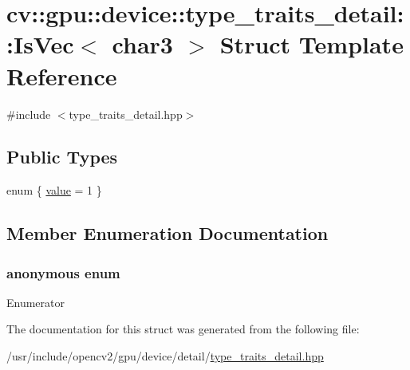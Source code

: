 \hypertarget{structcv_1_1gpu_1_1device_1_1type__traits__detail_1_1IsVec_3_01char3_01_4}{\section{cv\-:\-:gpu\-:\-:device\-:\-:type\-\_\-traits\-\_\-detail\-:\-:Is\-Vec$<$ char3 $>$ Struct Template Reference}
\label{structcv_1_1gpu_1_1device_1_1type__traits__detail_1_1IsVec_3_01char3_01_4}
}


{\ttfamily \#include $<$type\-\_\-traits\-\_\-detail.\-hpp$>$}

\subsection*{Public Types}
\begin{DoxyCompactItemize}
\item 
enum \{ \hyperlink{structcv_1_1gpu_1_1device_1_1type__traits__detail_1_1IsVec_3_01char3_01_4_adfe8cfcb6ecd7ea672fb497126e69597abaca22b8cb85e0fb992273477caae611}{value} = 1
 \}
\end{DoxyCompactItemize}


\subsection{Member Enumeration Documentation}
\hypertarget{structcv_1_1gpu_1_1device_1_1type__traits__detail_1_1IsVec_3_01char3_01_4_adfe8cfcb6ecd7ea672fb497126e69597}{\subsubsection[{anonymous enum}]{\setlength{\rightskip}{0pt plus 5cm}anonymous enum}}\label{structcv_1_1gpu_1_1device_1_1type__traits__detail_1_1IsVec_3_01char3_01_4_adfe8cfcb6ecd7ea672fb497126e69597}
\begin{Desc}
\item[Enumerator]\par
\begin{description}
\item[{\em 
\hypertarget{structcv_1_1gpu_1_1device_1_1type__traits__detail_1_1IsVec_3_01char3_01_4_adfe8cfcb6ecd7ea672fb497126e69597abaca22b8cb85e0fb992273477caae611}{value}\label{structcv_1_1gpu_1_1device_1_1type__traits__detail_1_1IsVec_3_01char3_01_4_adfe8cfcb6ecd7ea672fb497126e69597abaca22b8cb85e0fb992273477caae611}
}]\end{description}
\end{Desc}


The documentation for this struct was generated from the following file\-:\begin{DoxyCompactItemize}
\item 
/usr/include/opencv2/gpu/device/detail/\hyperlink{type__traits__detail_8hpp}{type\-\_\-traits\-\_\-detail.\-hpp}\end{DoxyCompactItemize}
